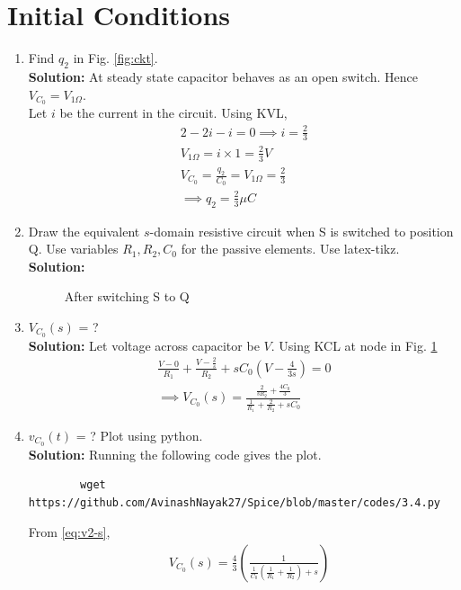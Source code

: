 \documentclass[journal,12pt,twocolumn]{IEEEtran}
\newcommand{\solution}{\noindent \textbf{Solution: }}
\providecommand{\brak}[1]{\ensuremath{\left(#1\right)}}
\numberwithin{equation}{section}
\renewcommand\thesection{\arabic{section}}
\begin{document}
 \section{Initial Conditions}
\begin{enumerate}[label=\arabic*.,ref=\thesection.\theenumi]
\item Find $q_2$ in Fig. \ref{fig:ckt}.\\
			\solution At steady state capacitor behaves as an open switch. Hence $V_{C_0}=V_{1 \Omega}$.\\
			Let $i$ be the current in the circuit. Using KVL,
			\begin{align}
				2-2i-i=0 \implies i=\frac{2}{3}\\
				V_{1 \Omega}=i \times 1= \frac{2}{3} V\\
			V_{C_0}=\frac{q_2}{C_0}=V_{1 \Omega}=\frac{2}{3}\\
			\implies q_2=\frac{2}{3} \mu C
			\end{align}
\item Draw the equivalent $s$-domain resistive circuit when S is switched to position Q.  Use variables $R_1, R_2, C_0$ for the passive elements.
Use latex-tikz.
		\label{prob:init}
		\\\solution 
	\begin{figure}[!ht]
 \centering

\caption{After switching S to Q}
\label{fig:sq}
\end{figure}
		\item $V_{C_0}(s)$ = ? \\
		\solution Let voltage across capacitor be $V$. Using KCL at node in Fig. \ref{fig:sq}
\begin{align}
    \frac{V - 0}{R_1} + \frac{V - \frac{2}{s}}{R_2} + sC_0\brak{V - \frac{4}{3s}} = 0 \\
\implies V_{C_0}(s) = \frac{\frac{2}{sR_2} + \frac{4C_0}{3}}{\frac{1}{R_1} + \frac{2}{R_2} + sC_0}
\label{eq:v2-s}
\end{align} 
	\item $v_{C_0}(t)$ = ? Plot using python.\\
	\solution Running the following code gives the plot.
	\begin{lstlisting}
		wget https://github.com/AvinashNayak27/Spice/blob/master/codes/3.4.py
	\end{lstlisting}
	From \eqref{eq:v2-s},
\begin{align}
    &V_{C_0}(s) = \frac{4}{3}\brak{\frac{1}{\frac{1}{C_0}\brak{\frac{1}{R_1} + \frac{1}{R_2}}+s}} \nonumber \\

\end{align}
\end{enumerate}
\end{document}
